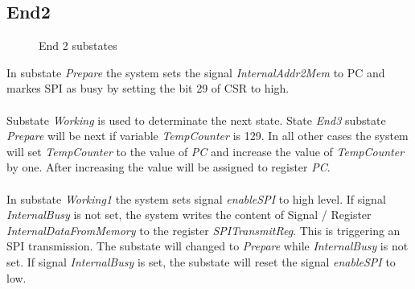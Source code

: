 \subsection{End2} 
\begin{figure}[htb] 
\begin{center}
\end{center}
\caption{End 2 substates}
\end{figure}
\noindent
In substate \textit{Prepare} the system sets the signal \textit{InternalAddr2Mem} to PC and markes SPI as busy by setting the bit 29 of CSR to high. \\\\
Substate \textit{Working} is used to determinate the next state. State \textit{End3} substate \textit{Prepare} will be next if variable \textit{TempCounter} is 129. In all other cases the system will set \textit{TempCounter} to the value of \textit{PC} and increase the value of \textit{TempCounter} by one. After increasing the value will be assigned to register \textit{PC}. \\\\
In substate \textit{Working1} the system sets signal \textit{enableSPI} to high level. If signal \textit{InternalBusy} is not set, the system
writes the content of Signal / Register \textit{InternalDataFromMemory} to the register \textit{SPITransmitReg}. This is triggering an SPI transmission. The substate will changed to \textit{Prepare} while \textit{InternalBusy} is not set. If signal \textit{InternalBusy} is set, the substate will reset the signal \textit{enableSPI} to low. 

